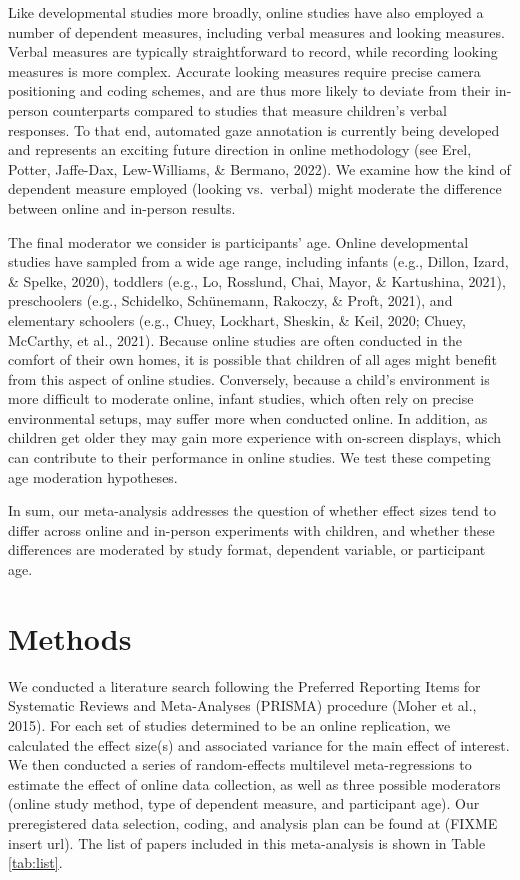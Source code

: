 \documentclass[
  man,floatsintext]{apa6}
\begin{document}
Like developmental studies more broadly, online studies have also employed a number of dependent measures, including verbal measures and looking measures. Verbal measures are typically straightforward to record, while recording looking measures is more complex. Accurate looking measures require precise camera positioning and coding schemes, and are thus more likely to deviate from their in-person counterparts compared to studies that measure children's verbal responses. To that end, automated gaze annotation is currently being developed and represents an exciting future direction in online methodology (see Erel, Potter, Jaffe-Dax, Lew-Williams, \& Bermano, 2022). We examine how the kind of dependent measure employed (looking vs.~verbal) might moderate the difference between online and in-person results.

The final moderator we consider is participants' age. Online developmental studies have sampled from a wide age range, including infants (e.g., Dillon, Izard, \& Spelke, 2020), toddlers (e.g., Lo, Rosslund, Chai, Mayor, \& Kartushina, 2021), preschoolers (e.g., Schidelko, Schünemann, Rakoczy, \& Proft, 2021), and elementary schoolers (e.g., Chuey, Lockhart, Sheskin, \& Keil, 2020; Chuey, McCarthy, et al., 2021). Because online studies are often conducted in the comfort of their own homes, it is possible that children of all ages might benefit from this aspect of online studies. Conversely, because a child's environment is more difficult to moderate online, infant studies, which often rely on precise environmental setups, may suffer more when conducted online. In addition, as children get older they may gain more experience with on-screen displays, which can contribute to their performance in online studies. We test these competing age moderation hypotheses.

In sum, our meta-analysis addresses the question of whether effect sizes tend to differ across online and in-person experiments with children, and whether these differences are moderated by study format, dependent variable, or participant age.

\hypertarget{methods}{%
\section{Methods}\label{methods}}

We conducted a literature search following the Preferred Reporting Items for Systematic Reviews and Meta-Analyses (PRISMA) procedure (Moher et al., 2015). For each set of studies determined to be an online replication, we calculated the effect size(s) and associated variance for the main effect of interest. We then conducted a series of random-effects multilevel meta-regressions to estimate the effect of online data collection, as well as three possible moderators (online study method, type of dependent measure, and participant age). Our preregistered data selection, coding, and analysis plan can be found at (FIXME insert url). The list of papers included in this meta-analysis is shown in Table \ref{tab:list}.
\end{document}
